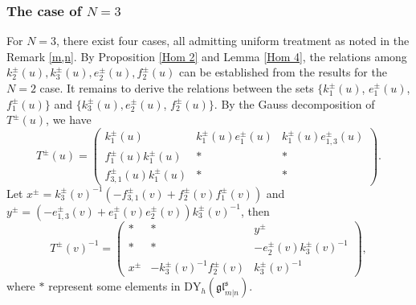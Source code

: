 \documentclass[a4paper,12pt]{article}
\numberwithin{equation}{section}
\begin{document}
\subsubsection{The case of $N=3$}
For $N=3$, there exist four cases, all admitting uniform treatment as noted in the Remark \ref{m,n}. 
By Proposition \ref{Hom 2} and Lemma \ref{Hom 4}, the relations among $k_2^{\pm}(u), k_3^{\pm}(u), e_2^{\pm}(u), f_2^{\pm}(u)$ can be established from the results for the $N=2$ case. It remains to derive the relations between the sets $\{k_1^{\pm}(u)$, $e_1^{\pm}(u)$, $f_1^{\pm}(u)\}$ and $\{k_3^{\pm}(u), e_2^{\pm}(u)$, $f_2^{\pm}(u)\}$.
By the Gauss decomposition of $T^{\pm}(u)$, we have
$$
T^{\pm}(u)=\left(\begin{array}{ccc}
k_1^{\pm}(u) & k_1^{\pm}(u)e_1^{\pm}(u) & k_{1}^{\pm}(u)e_{1,3}^{\pm}(u)
\\
f_1^{\pm}(u)k_1^{\pm}(u) & * & *
\\
f_{3,1}^{\pm}(u) k_1^{\pm}(u) & * & *
\end{array}\right).
$$
Let $x^{\pm}=k_{3}^{\pm}(v)^{-1}(-f_{3,1}^{\pm}(v)+f_{2}^{\pm}(v)f_{1}^{\pm}(v))$ and
 $y^{\pm}=(-e_{1,3}^{\pm}(v)+e_{1}^{\pm}(v)e_{2}^{\pm}(v))k_{3}^{\pm}(v)^{-1}$, then
$$
T^{\pm}(v)^{-1}=\left(\begin{array}{ccc}
* & * & y^{\pm}
\\
* & * & -e_2^{\pm}(v)k_3^{\pm}(v)^{-1}
\\
x^{\pm} & -k_3^{\pm}(v)^{-1}f_2^{\pm}(v) & k_3^{\pm}(v)^{-1}
\end{array}\right),
$$
where $*$ represent some elements in $\mathrm{DY}_{h}(\mathfrak{gl}^{\mathfrak{s}}_{m|n})$. 
\end{document}
